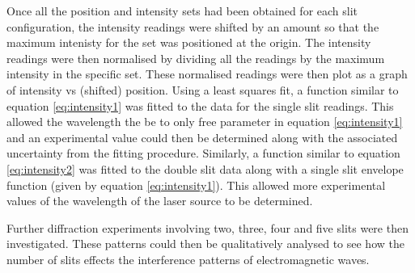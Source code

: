 \documentclass{article}
\begin{document}
\vspace{2mm}
\noindent
Once all the position and intensity sets had been obtained for each slit configuration, the intensity readings were shifted by an amount so that the maximum intenisty for the set was positioned at the origin. The intensity readings were then normalised by dividing all the readings by the maximum intensity in the specific set. These normalised readings were then plot as a graph of intensity vs (shifted) position. Using a least squares fit, a function similar to equation \eqref{eq:intensity1} was fitted to the data for the single slit readings. This allowed the wavelength the be to only free parameter in equation \eqref{eq:intensity1} and an experimental value could then be determined along with the associated uncertainty from the fitting procedure. Similarly, a function similar to equation \eqref{eq:intensity2} was fitted to the double slit data along with a single slit envelope function (given by equation \eqref{eq:intensity1}). This allowed more experimental values of the wavelength of the laser source to be determined.

\vspace{2mm}
\noindent
Further diffraction experiments involving two, three, four and five slits were then investigated. These patterns could then be qualitatively analysed to see how the number of slits effects the interference patterns of electromagnetic waves.










\end{document}
